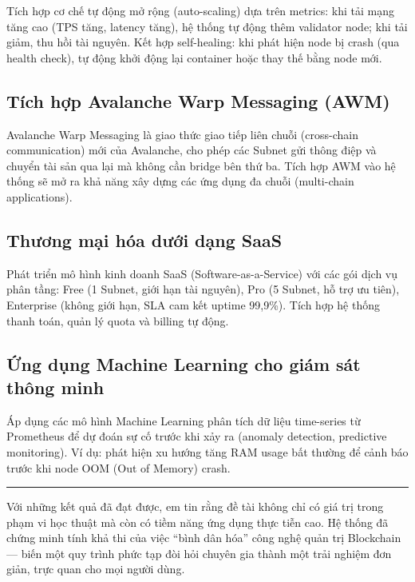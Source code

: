 Tích hợp cơ chế tự động mở rộng (auto-scaling) dựa trên metrics: khi tải mạng tăng cao (TPS tăng, latency tăng), hệ thống tự động thêm validator node; khi tải giảm, thu hồi tài nguyên. Kết hợp self-healing: khi phát hiện node bị crash (qua health check), tự động khởi động lại container hoặc thay thế bằng node mới.

\subsection{Tích hợp Avalanche Warp Messaging (AWM)}

Avalanche Warp Messaging là giao thức giao tiếp liên chuỗi (cross-chain communication) mới của Avalanche, cho phép các Subnet gửi thông điệp và chuyển tài sản qua lại mà không cần bridge bên thứ ba. Tích hợp AWM vào hệ thống sẽ mở ra khả năng xây dựng các ứng dụng đa chuỗi (multi-chain applications).

\subsection{Thương mại hóa dưới dạng SaaS}

Phát triển mô hình kinh doanh SaaS (Software-as-a-Service) với các gói dịch vụ phân tầng: Free (1 Subnet, giới hạn tài nguyên), Pro (5 Subnet, hỗ trợ ưu tiên), Enterprise (không giới hạn, SLA cam kết uptime 99,9\%). Tích hợp hệ thống thanh toán, quản lý quota và billing tự động.

\subsection{Ứng dụng Machine Learning cho giám sát thông minh}

Áp dụng các mô hình Machine Learning phân tích dữ liệu time-series từ Prometheus để dự đoán sự cố trước khi xảy ra (anomaly detection, predictive monitoring). Ví dụ: phát hiện xu hướng tăng RAM usage bất thường để cảnh báo trước khi node OOM (Out of Memory) crash.

\vspace{1cm}
\noindent\rule{\textwidth}{0.4pt}

\vspace{0.5cm}
Với những kết quả đã đạt được, em tin rằng đề tài không chỉ có giá trị trong phạm vi học thuật mà còn có tiềm năng ứng dụng thực tiễn cao. Hệ thống đã chứng minh tính khả thi của việc ``bình dân hóa'' công nghệ quản trị Blockchain --- biến một quy trình phức tạp đòi hỏi chuyên gia thành một trải nghiệm đơn giản, trực quan cho mọi người dùng.
